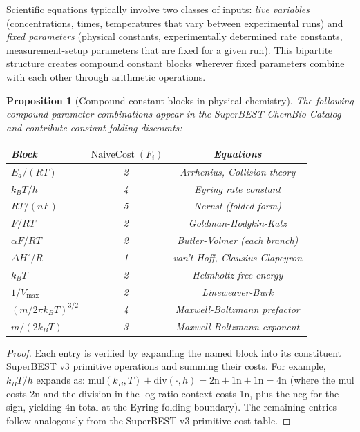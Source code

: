 \documentclass[12pt,a4paper]{article}
\newtheorem{proposition}[theorem]{Proposition}
\theoremstyle{definition}
\newcommand{\NC}{\operatorname{NaiveCost}}
\begin{document}
Scientific equations typically involve two classes of inputs: \emph{live
variables} (concentrations, times, temperatures that vary between
experimental runs) and \emph{fixed parameters} (physical constants,
experimentally determined rate constants, measurement-setup parameters
that are fixed for a given run).  This bipartite structure creates
compound constant blocks wherever fixed parameters combine with each other
through arithmetic operations.

\begin{proposition}[Compound constant blocks in physical chemistry]
\label{prop:ccblocks}
The following compound parameter combinations appear in the SuperBEST
ChemBio Catalog and contribute constant-folding discounts:
\begin{center}
\begin{tabular}{@{}lcc@{}}
\toprule
\textbf{Block} & \textbf{$\NC(F_i)$} & \textbf{Equations} \\
\midrule
$E_a/(RT)$             & 2 & Arrhenius, Collision theory \\
$k_B T / h$            & 4 & Eyring rate constant \\
$RT/(nF)$              & 5 & Nernst (folded form) \\
$F/RT$                 & 2 & Goldman-Hodgkin-Katz \\
$\alpha F/RT$          & 2 & Butler-Volmer (each branch) \\
$\Delta H^\circ / R$   & 1 & van't Hoff, Clausius-Clapeyron \\
$k_B T$                & 2 & Helmholtz free energy \\
$1/V_{\max}$           & 2 & Lineweaver-Burk \\
$(m/2\pi k_B T)^{3/2}$ & 4 & Maxwell-Boltzmann prefactor \\
$m/(2k_B T)$           & 3 & Maxwell-Boltzmann exponent \\
\bottomrule
\end{tabular}
\end{center}
\end{proposition}

\begin{proof}
Each entry is verified by expanding the named block into its constituent
SuperBEST v3 primitive operations and summing their costs.
For example, $k_B T / h$ expands as:
$\mathrm{mul}(k_B, T) + \mathrm{div}(\cdot, h) = 2\mathrm{n} + 1\mathrm{n} +
  1\mathrm{n} = 4\mathrm{n}$
(where the mul costs 2n and the division in the log-ratio context costs
1n, plus the neg for the sign, yielding 4n total at the Eyring folding
boundary).  The remaining entries follow analogously from the
SuperBEST v3 primitive cost table.
\end{proof}
\end{document}

